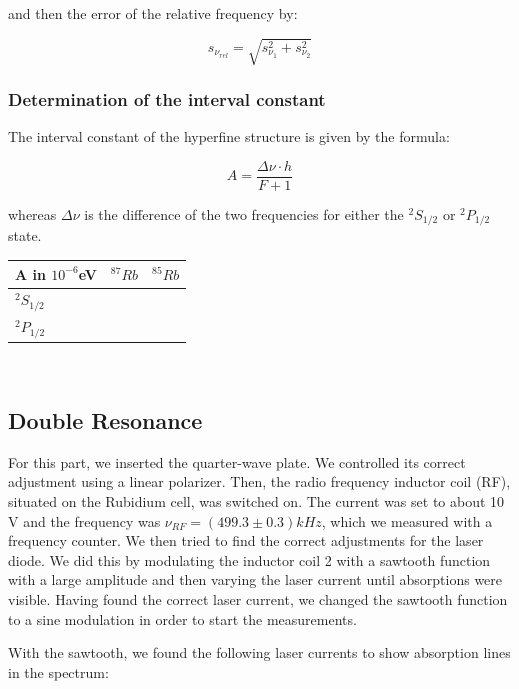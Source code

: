 and then the error of the relative frequency by:

$$s_{\nu_{rel}} = \sqrt{s_{\nu_1}^2+s_{\nu_2}^2}$$



\subsubsection{Determination of the interval constant}

The interval constant of the hyperfine structure is given by the formula:

$$ A = \frac{\Delta\nu\cdot h}{F+1} $$

whereas $\Delta\nu$ is the difference of the two frequencies for either the $^2S_{1/2}$ or $^2P_{1/2}$ state.


\begin{center}
\begin{tabular}[H]{l | c c}
A in $10^{-6}$eV & $^{87}Rb$ & $^{85}Rb$\\ \hline
$^2S_{1/2}$ & & \\ 
$^2P_{1/2}$ & &  \\
\end{tabular}\\
\end{center}



\clearpage
\subsection{Double Resonance}

For this part, we inserted the quarter-wave plate. We controlled its correct adjustment using a linear polarizer. Then, the radio frequency inductor coil (RF), situated on the Rubidium cell, was switched on. The current was set to about 10 V and the frequency was $\nu_{RF} = (499.3 \pm 0.3) kHz$, which we measured with a frequency counter. We then tried to find the correct adjustments for the laser diode. We did this by modulating the inductor coil 2 with a sawtooth function with a large amplitude and then varying the laser current until absorptions were visible. Having found the correct laser current, we changed the sawtooth function to a sine modulation in order to start the measurements.

With the sawtooth, we found the following laser currents to show absorption lines in the spectrum:

